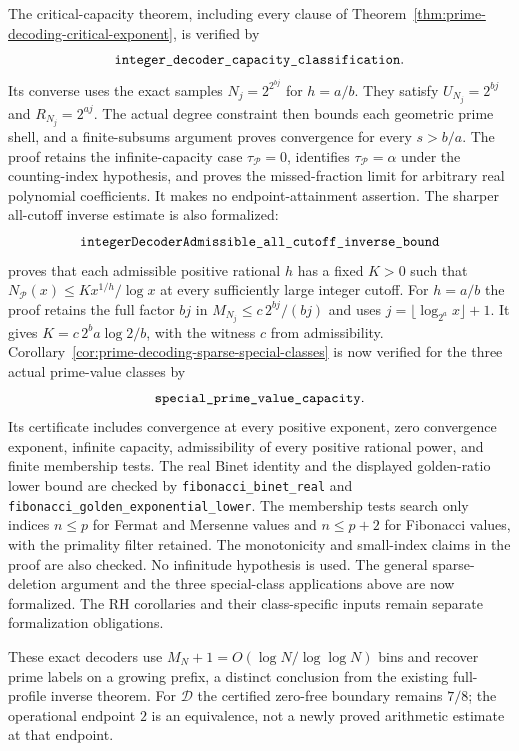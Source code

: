 \documentclass[11pt]{article}
\theoremstyle{definition}
\begin{document}
The critical-capacity theorem, including every clause of
Theorem~\ref{thm:prime-decoding-critical-exponent}, is verified by
\[
 \texttt{integer\_\allowbreak decoder\_\allowbreak capacity\_\allowbreak classification}.
\]
Its converse uses the exact samples
$N_j=2^{2^{bj}}$ for $h=a/b$.
They satisfy $U_{N_j}=2^{bj}$ and $R_{N_j}=2^{aj}$.
The actual degree constraint then bounds each geometric prime
shell, and a finite-subsums argument proves convergence for
every $s>b/a$.
The proof retains the infinite-capacity case $\tau_{\mathcal P}=0$,
identifies $\tau_{\mathcal P}=\alpha$ under the counting-index
hypothesis, and proves the missed-fraction limit for arbitrary
real polynomial coefficients.
It makes no endpoint-attainment assertion.
The sharper all-cutoff inverse estimate is also formalized:
\[
 \texttt{integerDecoderAdmissible\_\allowbreak all\_\allowbreak cutoff\_\allowbreak inverse\_\allowbreak bound}
\]
proves that each admissible positive rational $h$ has a fixed $K>0$
such that
$N_{\mathcal P}(x)\le Kx^{1/h}/\log x$
at every sufficiently large integer cutoff.
For $h=a/b$ the proof retains the full factor $bj$ in
$M_{N_j}\le c\,2^{bj}/(bj)$ and uses
$j=\lfloor\log_{2^a}x\rfloor+1$.
It gives $K=c\,2^b a\log2/b$, with the witness $c$
from admissibility.
Corollary~\ref{cor:prime-decoding-sparse-special-classes} is now
verified for the three actual prime-value classes by
\[
 \texttt{special\_\allowbreak prime\_\allowbreak value\_\allowbreak capacity}.
\]
Its certificate includes convergence at every positive exponent,
zero convergence exponent, infinite capacity, admissibility of
every positive rational power, and finite membership tests.
The real Binet identity and the displayed golden-ratio lower
bound are checked by
\texttt{fibonacci\_binet\_real} and
\texttt{fibonacci\_golden\_exponential\_lower}.
The membership tests search only indices
$n\le p$ for Fermat and Mersenne values and $n\le p+2$
for Fibonacci values, with the primality filter retained.
The monotonicity and small-index claims in the proof are
also checked. No infinitude hypothesis is used.
The general sparse-deletion argument and the three special-class
applications above are now formalized.
The RH corollaries and their class-specific inputs remain
separate formalization obligations.

These exact decoders use $M_N+1=O(\log N/\log\log N)$ bins
and recover prime labels on a growing prefix, a distinct conclusion
from the existing full-profile inverse theorem.
For $\mathcal D$ the certified zero-free boundary remains $7/8$;
the operational endpoint $2$ is an equivalence, not a newly
proved arithmetic estimate at that endpoint.
\end{document}
